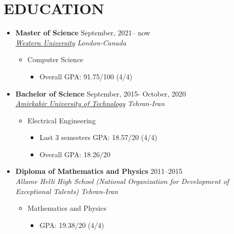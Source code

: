 \documentclass[10pt,a4paper,sans]{moderncv} %
\begin{document}
	\section{EDUCATION}
        \begin{itemize}
            \item \textbf{Master of Science} \hfill September, 2021-- now \\ 
        \href{https://www.uwo.ca}{ \emph{Western University}} \hfill \emph{London-Canada}
            \begin{itemize}
                \item Computer Science \hspace{10 pt}  \hspace{10 pt}  \hfill
                \begin{itemize}
                    \item Overall GPA: 91.75/100 (4/4)
                \end{itemize}
            \end{itemize}
            

            \item \textbf{Bachelor of Science} \hfill September, 2015- October, 2020 \\ 
        \href{http://aut.ac.ir/aut/}{ \emph{Amirkabir University of Technology}} \hfill \emph{Tehran-Iran}
            \begin{itemize}
                \item Electrical Engineering \hspace{10 pt}  \hspace{10 pt}  \hfill  
                \begin{itemize}
                    \item Last 3 semesters GPA: 18.57/20 (4/4)
                    \item Overall GPA: 18.26/20 
                \end{itemize}
            \end{itemize}
            
            
            \item \textbf{Diploma of Mathematics and Physics} \hfill 2011--2015 \\
             \emph{Allame Helli High School (National Organization for Development of Exceptional Talents)} \hfill \emph{Tehran-Iran}
            
            \begin{itemize}
                \item Mathematics and Physics
                \begin{itemize}		
                    \item GPA: 19.38/20 (4/4)
                \end{itemize}
            \end{itemize}

        \end{itemize}
\end{document}
